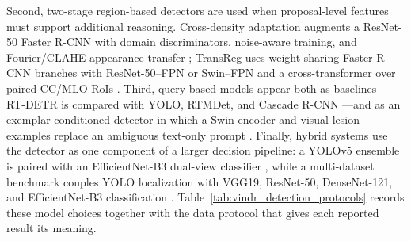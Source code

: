 Second, two-stage region-based detectors are used when proposal-level features
must support additional reasoning. Cross-density adaptation augments a
ResNet-50 Faster R-CNN with domain discriminators, noise-aware training, and
Fourier/CLAHE appearance transfer \cite{nguyen2023crossdensity}; TransReg uses
weight-sharing Faster R-CNN branches with ResNet-50--FPN or Swin--FPN and a
cross-transformer over paired CC/MLO RoIs \cite{nguyen2023transreg}. Third,
query-based models appear both as baselines---RT-DETR is compared with YOLO,
RTMDet, and Cascade R-CNN \cite{abdikenov2025transfer}---and as an
exemplar-conditioned detector in which a Swin encoder and visual lesion
examples replace an ambiguous text-only prompt \cite{bhat2025exemplar}.
Finally, hybrid systems use the detector as one component of a larger decision
pipeline: a YOLOv5 ensemble is paired with an EfficientNet-B3 dual-view
classifier \cite{kebede2024dualview}, while a multi-dataset benchmark couples
YOLO localization with VGG19, ResNet-50, DenseNet-121, and EfficientNet-B3
classification \cite{zepeda2026density}. Table~\ref{tab:vindr_detection_protocols}
records these model choices together with the data protocol that gives each
reported result its meaning.

